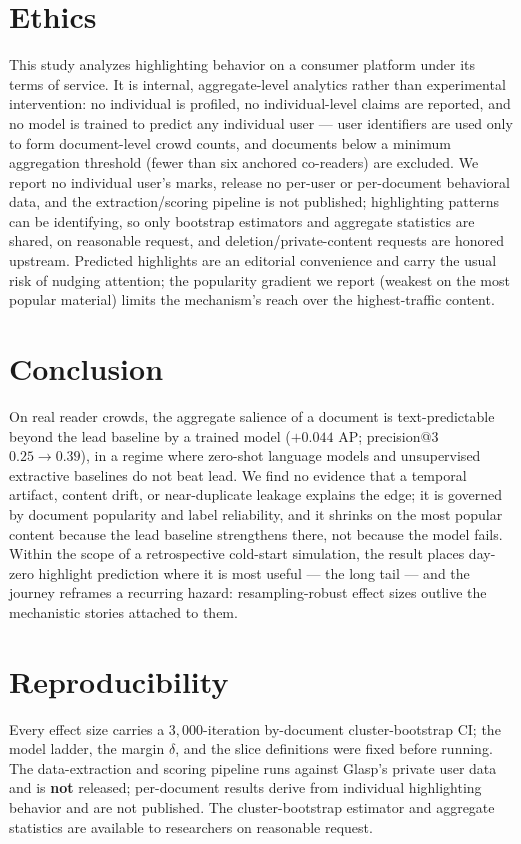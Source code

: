 \documentclass[11pt]{article}
\begin{document}
\section{Ethics}
This study analyzes highlighting behavior on a consumer platform under its terms of service. It
is internal, aggregate-level analytics rather than experimental intervention: no individual is
profiled, no individual-level claims are reported, and no model is trained to predict any
individual user --- user identifiers are used
only to form document-level crowd counts, and documents below a minimum aggregation threshold
(fewer than six anchored co-readers) are excluded. We report no individual user's marks, release
no per-user or per-document behavioral data, and the extraction/scoring pipeline is not published;
highlighting patterns can be identifying, so only bootstrap estimators and aggregate statistics
are shared, on reasonable request, and deletion/private-content requests are honored upstream.
Predicted highlights are an editorial convenience and carry the usual risk of nudging attention;
the popularity gradient we report (weakest on the most popular material) limits the mechanism's
reach over the highest-traffic content.

\section{Conclusion}
On real reader crowds, the aggregate salience of a document is text-predictable beyond the lead
baseline by a trained model ($+0.044$ AP; precision@3 $0.25\to0.39$), in a regime where zero-shot
language models and unsupervised extractive baselines do not beat lead. We find no evidence that
a temporal artifact, content drift, or near-duplicate leakage explains the edge; it is governed
by document popularity and label reliability, and it shrinks on the most popular content because
the lead baseline strengthens there, not because the model fails. Within the scope of a
retrospective cold-start simulation, the result places day-zero highlight prediction where it is
most useful --- the long tail --- and the
journey reframes a recurring hazard: resampling-robust effect sizes outlive the mechanistic
stories attached to them.

\section*{Reproducibility}
Every effect size carries a $3{,}000$-iteration by-document cluster-bootstrap CI; the model
ladder, the margin $\delta$, and the slice definitions were fixed before running. The
data-extraction and scoring pipeline runs against Glasp's private user data and is \textbf{not}
released; per-document results derive from individual highlighting behavior and are not published.
The cluster-bootstrap estimator and aggregate statistics are available to researchers on
reasonable request.
\end{document}
